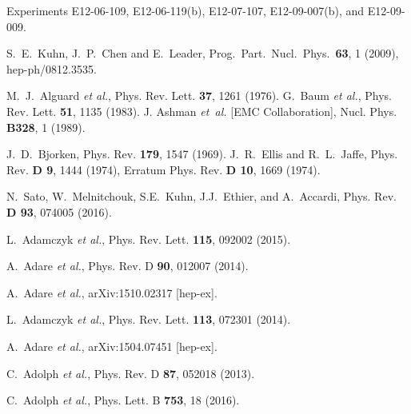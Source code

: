 \documentclass[a4paper,12pt]{report}
\begin{document}
\begin{thebibliography}{99}
 Experiments E12-06-109, E12-06-119(b), E12-07-107, E12-09-007(b), and E12-09-009.

  S.~E.~Kuhn, J.~P.~Chen and E.~Leader,
Prog.\ Part.\ Nucl.\ Phys.\  {\bf 63}, 1 (2009), hep-ph/0812.3535.

  M.~J.~Alguard {\it et al.},
  Phys. Rev. Lett. {\bf 37}, 1261 (1976).
 G.~Baum {\it et al.},
  Phys. Rev. Lett. {\bf 51}, 1135 (1983). 
J. Ashman {\it et~al.} [EMC Collaboration],
Nucl. Phys. {\bf B328}, 1 (1989).

  J.~D.~Bjorken,
  Phys. Rev. {\bf 179}, 1547 (1969). 
  J.~R.~Ellis and R.~L.~Jaffe,
  Phys. Rev. {\bf D 9}, 1444 (1974), Erratum Phys. Rev. {\bf D 10}, 1669 (1974).
 
 N.~Sato, W.~Melnitchouk, S.E.~Kuhn, J.J.~Ethier, and A.~Accardi,
 Phys. Rev. {\bf D 93}, 074005 (2016). 

L.~Adamczyk {\it et al.}, %
Phys. Rev. Lett. {\bf 115}, 092002 (2015).

A.~Adare {\it et al.}, %
Phys. Rev. D {\bf 90}, 012007 (2014).

A.~Adare {\it et al.}, %
arXiv:1510.02317 [hep-ex].

L.~Adamczyk {\it et al.}, %
Phys. Rev. Lett. {\bf 113}, 072301 (2014).

A.~Adare {\it et al.}, %
arXiv:1504.07451 [hep-ex].

C.~Adolph {\it et al.}, %
Phys. Rev. D {\bf 87}, 052018 (2013).

C.~Adolph {\it et al.}, %
Phys. Lett. B {\bf 753}, 18 (2016).


\end{thebibliography}
\end{document}
